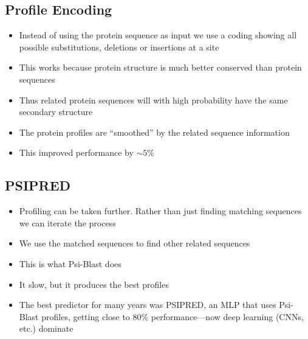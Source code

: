 \begin{slide}
\section{Profile Encoding}

\begin{PauseHighLight}
  \begin{itemize}
  \item Instead of using the protein sequence as input we use a coding
    showing all possible substitutions, deletions or insertions at a
    site\pause
  \item This works because protein structure is much better conserved
    than protein sequences\pause
  \item Thus related protein sequences will with high probability have
    the same secondary structure\pause
  \item The protein profiles are ``smoothed'' by the related sequence
    information\pause
  \item This improved performance by $\sim5\%$\pause
  \end{itemize}
\end{PauseHighLight}

\end{slide}


\begin{slide}
\section[-1]{PSIPRED}

\begin{PauseHighLight}
  \begin{itemize}
  \item Profiling can be taken further.  Rather than just finding
    matching sequences we can iterate the process\pause
  \item We use the matched sequences to find other related
    sequences\pause
  \item This is what Psi-Blast does\pause
  \item It slow, but it produces the best profiles\pause
  \item The best predictor for many years was PSIPRED, an MLP that uses
    Psi-Blast profiles, getting close to 80\% performance\pause---now
    deep learning (CNNs, etc.) dominate\pauseb
  \end{itemize}
\end{PauseHighLight}

\end{slide}

